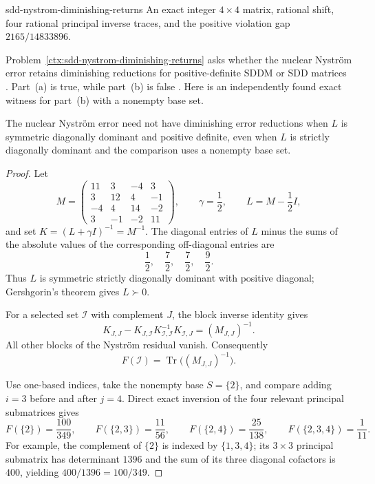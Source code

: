 \begin{cxcertificate}{sdd-nystrom-diminishing-returns}
An exact integer $4\times4$ matrix, rational shift, four rational principal
inverse traces, and the positive violation gap $2165/14833896$.
\end{cxcertificate}

\begin{cxrefutation}
Problem~\ref{ctx:sdd-nystrom-diminishing-returns} asks whether the nuclear
Nystr\"om error retains diminishing reductions for positive-definite SDDM or
SDD matrices \cite{AmselEtAl2026}.
Part~(a) is true, while part~(b) is false \cite{Colbrook2026}.  Here is an
independently found exact witness for part~(b) with a nonempty base set.

\begin{theorem}
\label{thm:sdd-nystrom-diminishing-returns}
The nuclear Nystr\"om error need not have diminishing error reductions when
$L$ is symmetric diagonally dominant and positive definite, even when $L$ is
strictly diagonally dominant and the comparison uses a nonempty base set.
\end{theorem}
\begin{proof}
Let
\[
 M=\begin{pmatrix}
 11&3&-4&3\\
 3&12&4&-1\\
 -4&4&14&-2\\
 3&-1&-2&11
 \end{pmatrix},\qquad
 \gamma=\frac12,\qquad L=M-\frac12I,
\]
and set $K=(L+\gamma I)^{-1}=M^{-1}$.  The diagonal entries of $L$ minus the
sums of the absolute values of the corresponding off-diagonal entries are
\[
 \frac12,\quad\frac72,\quad\frac72,\quad\frac92.
\]
Thus $L$ is symmetric strictly diagonally dominant with positive diagonal;
Gershgorin's theorem gives $L\succ0$.

For a selected set $\mathcal I$ with complement $J$, the block inverse
identity gives
\[
 K_{J,J}-K_{J,\mathcal I}K_{\mathcal I,\mathcal I}^{-1}
 K_{\mathcal I,J}=(M_{J,J})^{-1}.
\]
All other blocks of the Nystr\"om residual vanish.  Consequently
\[
 F(\mathcal I)=\operatorname{Tr}\bigl((M_{J,J})^{-1}\bigr).
\]

Use one-based indices, take the nonempty base $S=\{2\}$, and compare adding
$i=3$ before and after $j=4$.  Direct exact inversion of the four relevant
principal submatrices gives
\[
 F(\{2\})=\frac{100}{349},\qquad
 F(\{2,3\})=\frac{11}{56},\qquad
 F(\{2,4\})=\frac{25}{138},\qquad
 F(\{2,3,4\})=\frac1{11}.
\]
For example, the complement of $\{2\}$ is indexed by $\{1,3,4\}$; its
$3\times3$ principal submatrix has determinant $1396$ and the sum of its
three diagonal cofactors is $400$, yielding $400/1396=100/349$.


\end{proof}
\end{cxrefutation}
